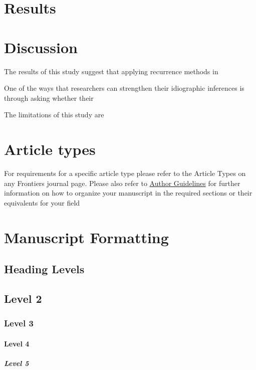 \documentclass[utf8]{FrontiersinVancouver}
\begin{document}
\section{Results}

\section{Discussion}
The results of this study suggest that applying recurrence methods in 

One of the ways that researchers can strengthen their idiographic inferences is through asking whether their 

The limitations of this study are 
\section{Article types}

For requirements for a specific article type please refer to the Article Types on any Frontiers journal page. Please also refer to \href{http://home.frontiersin.org/about/author-guidelines#Sections}{Author Guidelines} for further information on how to organize your manuscript in the required sections or their equivalents for your field


\section{Manuscript Formatting}

\subsection{Heading Levels}


\subsection{Level 2}
\subsubsection{Level 3}
\paragraph{Level 4}
\subparagraph{Level 5}
\end{document}

